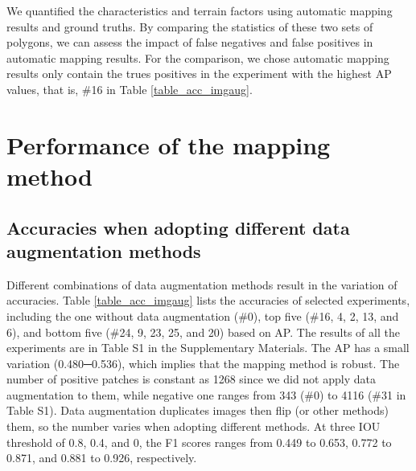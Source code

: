 \documentclass[preprint,12pt,authoryear]{elsarticle}
\begin{document}
We quantified the characteristics and terrain factors using automatic mapping results and ground truths. By comparing the statistics of these two sets of polygons, we can assess the impact of false negatives and false positives in automatic mapping results. For the comparison, we chose automatic mapping results only contain the trues positives in the experiment with the highest AP values, that is, \#16 in Table \ref{table_acc_imgaug}. 


\section{Performance of the mapping method}
\label{sec_performance}

\subsection{Accuracies when adopting different data augmentation methods}
\label{subsub_accuracies}
Different combinations of data augmentation methods result in the variation of accuracies.  Table \ref{table_acc_imgaug} lists the accuracies of selected experiments, including the one without data augmentation (\#0), top five (\#16, 4, 2, 13, and 6), and bottom five (\#24, 9, 23, 25, and 20) based on AP. The results of all the experiments are in Table S1 in the Supplementary Materials. The AP has a small variation (0.480─0.536), which implies that the mapping method is robust. The number of positive patches is constant as 1268 since we did not apply data augmentation to them, while negative one ranges from 343 (\#0) to 4116 (\#31 in Table S1). Data augmentation duplicates images then flip (or other methods) them, so the number varies when adopting different methods. At three IOU threshold of 0.8, 0.4, and 0, the F1 scores ranges from 0.449 to 0.653, 0.772 to 0.871, and 0.881 to 0.926, respectively. 
\end{document}
